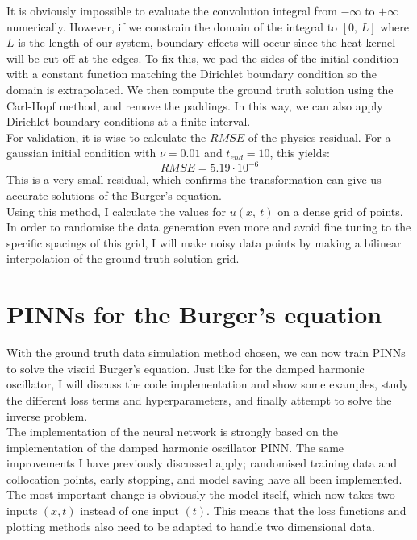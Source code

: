 \documentclass[we,twoside,openright,a4paper,11pt]{uantwerpenbamathesis}
\begin{document}
It is obviously impossible to evaluate the convolution integral from $-\infty$ to $+\infty$ numerically. However, if we constrain the domain of the integral to $[0,\, L]$ where $L$ is the length of our system, boundary effects will occur since the heat kernel will be cut off at the edges. To fix this, we pad the sides of the initial condition with a constant function matching the Dirichlet boundary condition so the domain is extrapolated. We then compute the ground truth solution using the Carl-Hopf method, and remove the paddings. In this way, we can also apply Dirichlet boundary conditions at a finite interval.\\

For validation, it is wise to calculate the $RMSE$ of the physics residual. For a gaussian initial condition with $\nu=0.01$ and $t_{end}=10$, this yields:
\begin{equation*}
    RMSE=5.19\cdot 10^{-6}
\end{equation*}
This is a very small residual, which confirms the transformation can give us accurate solutions of the Burger's equation.\\

Using this method, I calculate the values for $u(x,\ t)$ on a dense grid of points. In order to randomise the data generation even more and avoid fine tuning to the specific spacings of this grid, I will make noisy data points by making a bilinear interpolation of the ground truth solution grid.
\section{PINNs for the Burger's equation}
With the ground truth data simulation method chosen, we can now train PINNs to solve the viscid Burger's equation. Just like for the damped harmonic oscillator, I will discuss the code implementation and show some examples, study the different loss terms and hyperparameters, and finally attempt to solve the inverse problem.\\

The implementation of the neural network is strongly based on the implementation of the damped harmonic oscillator PINN. The same improvements I have previously discussed apply; randomised training data and collocation points, early stopping, and model saving have all been implemented. The most important change is obviously the model itself, which now takes two inputs $(x, t)$ instead of one input $(t)$. This means that the loss functions and plotting methods also need to be adapted to handle two dimensional data.\\
\end{document}
